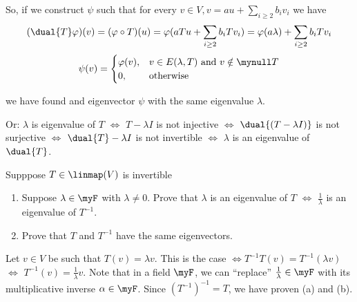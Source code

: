 \begin{xrcs}
\begin{xsol}
    So, if we construct $\psi$ such that for every $v \in V, v=au + \sum_{i \geq 2} b_i v_i$ we have
    \begin{equation}
      (\dual{T} \varphi)(v) = (\varphi \circ T) (u) = \varphi(aTu + \sum_{i \geq 2} b_i T v_i) =\varphi(a \lambda) + \sum_{i \geq 2} b_i T v_i
    \end{equation}
    \begin{equation}
      \psi(v) = \begin{cases}
        \varphi(v), & v \in E(\lambda, T) \text{ and } v \notin \mynull T \\
        0, & \text{otherwise}
      \end{cases}
    \end{equation}

    we have found and eigenvector $\psi$ with the same eigenvalue $\lambda$.

    Or: $\lambda$ is eigenvalue of $T$ $\iff$ $T-\lambda I$ is not injective $\iff$ $\dual{(T-\lambda I)}$ is not surjective $\iff$ $\dual{T} - \lambda I$ is not invertible $\iff$ $\lambda$ is an eigenvalue of $\dual{T}$.
  \end{xsol}
\end{xrcs}

\begin{xrcs}
  Supppose $T \in \linmap(V)$ is invertible
  \begin{enumerate}
    \item Suppose $\lambda \in \myF$ with $\lambda \neq 0$. Prove that $\lambda$ is an eigenvalue of $T$ $\iff$ $\frac{1}{\lambda}$ is an eigenvalue of $T^{-1}$.
    \item Prove that $T$ and $T^{-1}$ have the same eigenvectors.
  \end{enumerate}
  \begin{xsol}
    Let $v \in V$ be such that $T(v) = \lambda v$. This is the case $\iff T^{-1} T(v) = T^{-1} (\lambda v)$ $\iff$ $T^{-1} (v) = \frac{1}{\lambda} v$. Note that in a field $\myF$, we can ``replace'' $\frac{1}{\lambda}\in \myF$ with its multiplicative inverse $\alpha \in \myF$. Since $\left(T^{-1}\right)^{-1} = T$, we have proven (a) and (b).
  \end{xsol}
\end{xrcs}

